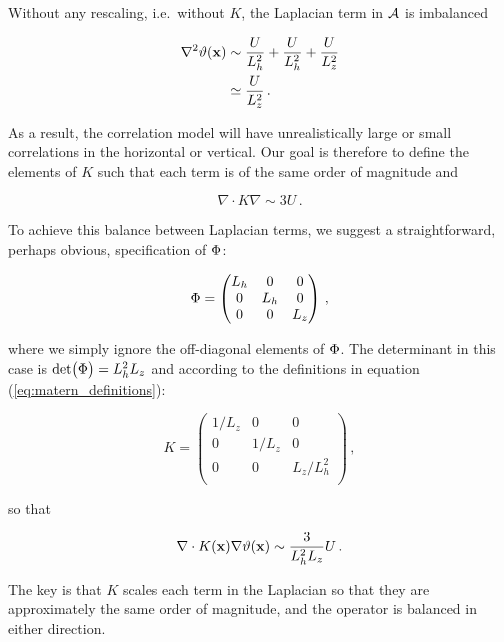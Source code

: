 Without any rescaling, i.e.\ without $K$,
the Laplacian term in $\mathcal{A}$ is imbalanced
\begin{linenomath*}\begin{equation}
    \begin{aligned}
        \nabla^2 \vartheta(\mathbf{x})
            & \sim \dfrac{U}{L_h^2} + \dfrac{U}{L_h^2} + \dfrac{U}{L_z^2} \\
            & \simeq \dfrac{U}{L_z^2} \, .
    \end{aligned}
    \label{eq:iso_lap}
\end{equation}\end{linenomath*}
As a result, the correlation model will
have unrealistically large or small correlations in the horizontal or vertical.
Our goal is therefore to define the elements of $K$ such that each term is of
the same order of magnitude and
\begin{linenomath*}\begin{equation*}
    \nabla\cdot K\nabla \sim 3U \, .
\end{equation*}\end{linenomath*}

To achieve this balance between Laplacian terms, we suggest a straightforward,
perhaps obvious, specification of $\Phi$:
\begin{linenomath*}\begin{equation*}
    \Phi =
        \begin{pmatrix}
            L_h & 0 & 0     \\
            0 & L_h & 0     \\
            0 & 0   & L_z   \\
        \end{pmatrix} \, ,
\end{equation*}\end{linenomath*}
where we simply ignore the off-diagonal elements of $\Phi$.
The determinant in this case is $\text{det}\big(\Phi\big) = L_h^2L_z$ and
according to the definitions in equation (\ref{eq:matern_definitions}):
\begin{linenomath*}\begin{equation*}
    K =
        \begin{pmatrix}
            1/L_z & 0 & 0     \\
            0 & 1/L_z & 0     \\
            0 & 0   & L_z/L_h^2   \\
        \end{pmatrix} \, ,
\end{equation*}\end{linenomath*}
so that
\begin{linenomath*}\begin{equation*}
    \nabla\cdot K(\mathbf{x})\nabla\vartheta(\mathbf{x}) \sim \dfrac{3}{L_h^2L_z}U \, .
\end{equation*}\end{linenomath*}
The key is that $K$ scales each term in the Laplacian so that they are
approximately the same order of magnitude, and the operator is balanced in either direction.

